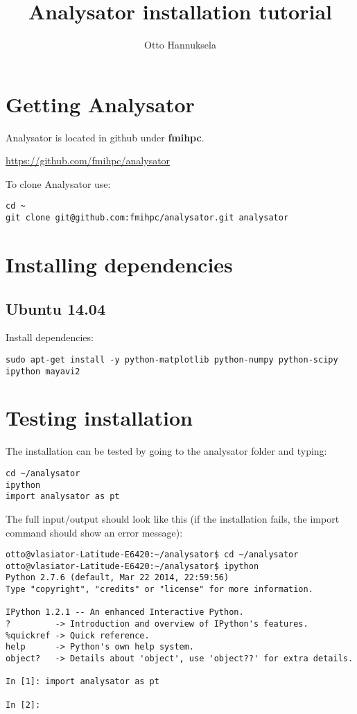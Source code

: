 \documentclass[a4paper,10pt]{article}
\title{Analysator installation tutorial}
\author{Otto Hannuksela}
\begin{document}
\maketitle

\tableofcontents

\newpage

\section{Getting Analysator} 

Analysator is located in github under \textbf{fmihpc}.

\url{https://github.com/fmihpc/analysator}

To clone Analysator use:

\begin{verbatim}
cd ~
git clone git@github.com:fmihpc/analysator.git analysator
\end{verbatim}


\section{Installing dependencies}

\subsection{Ubuntu 14.04}

Install dependencies:

\begin{verbatim}
sudo apt-get install -y python-matplotlib python-numpy python-scipy ipython mayavi2
\end{verbatim}

\section{Testing installation}

The installation can be tested by going to the analysator folder and typing:

\begin{verbatim}
cd ~/analysator
ipython
import analysator as pt
\end{verbatim}

The full input/output should look like this (if the installation fails, the import command should 
show an error message):
\begin{verbatim}
otto@vlasiator-Latitude-E6420:~/analysator$ cd ~/analysator
otto@vlasiator-Latitude-E6420:~/analysator$ ipython
Python 2.7.6 (default, Mar 22 2014, 22:59:56) 
Type "copyright", "credits" or "license" for more information.

IPython 1.2.1 -- An enhanced Interactive Python.
?         -> Introduction and overview of IPython's features.
%quickref -> Quick reference.
help      -> Python's own help system.
object?   -> Details about 'object', use 'object??' for extra details.

In [1]: import analysator as pt

In [2]: 

\end{verbatim}
\end{document}
